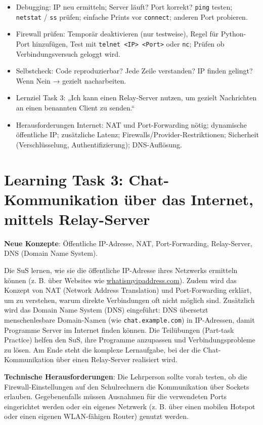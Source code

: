 \begin{myexercise}
\begin{myanswer}
\begin{itemize}
    \item Debugging: IP neu ermitteln; Server läuft? Port korrekt? \texttt{ping} testen; \texttt{netstat} / \texttt{ss} prüfen; einfache Prints vor \texttt{connect}; anderen Port probieren.
    \item Firewall prüfen: Temporär deaktivieren (nur testweise), Regel für Python-Port hinzufügen, Test mit \texttt{telnet <IP> <Port>} oder \texttt{nc}; Prüfen ob Verbindungsversuch geloggt wird.
    \item Selbstcheck: Code reproduzierbar? Jede Zeile verstanden? IP finden gelingt? Wenn Nein → gezielt nacharbeiten.
    \item Lernziel Task 3: „Ich kann einen Relay-Server nutzen, um gezielt Nachrichten an einen benannten Client zu senden.“
    \item Herausforderungen Internet: NAT und Port-Forwarding nötig; dynamische öffentliche IP; zusätzliche Latenz; Firewalls/Provider-Restriktionen; Sicherheit (Verschlüsselung, Authentifizierung); DNS-Auflösung.
\end{itemize}
\end{myanswer}
    
\end{myexercise}
\section{Learning Task 3: Chat-Kommunikation über das Internet, mittels Relay-Server}

\begin{scaffoldBox}
    \textbf{Neue Konzepte}: Öffentliche IP-Adresse, NAT, Port-Forwarding, Relay-Server, DNS (Domain Name System).

    Die SuS lernen, wie sie die öffentliche IP-Adresse ihres Netzwerks ermitteln können (z. B. über Websites wie \href{https://whatismyipaddress.com/}{whatismyipaddress.com}). Zudem wird das Konzept von NAT (Network Address Translation) und Port-Forwarding erklärt, um zu verstehen, warum direkte Verbindungen oft nicht möglich sind. Zusätzlich wird das Domain Name System (DNS) eingeführt: DNS übersetzt menschenlesbare Domain-Namen (wie \texttt{chat.example.com}) in IP-Adressen, damit Programme Server im Internet finden können. Die Teilübungen (Part-task Practice) helfen den SuS, ihre Programme anzupassen und Verbindungsprobleme zu lösen. Am Ende steht die komplexe Lernaufgabe, bei der die Chat-Kommunikation über einen Relay-Server realisiert wird.

    \textbf{Technische Herausforderungen}: Die Lehrperson sollte vorab testen, ob die Firewall-Einstellungen auf den Schulrechnern die Kommunikation über Sockets erlauben. Gegebenenfalls müssen Ausnahmen für die verwendeten Ports eingerichtet werden oder ein eigenes Netzwerk (z. B. über einen mobilen Hotspot oder einen eigenen WLAN-fähigen Router) genutzt werden.
\end{scaffoldBox}


